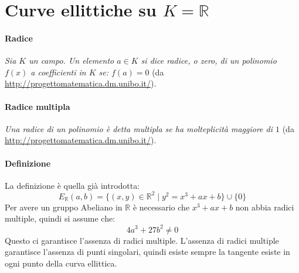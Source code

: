 

\section{Curve ellittiche su $K=\mathbb{R}$}
\paragraph{Radice} \emph{Sia $K$ un campo. Un elemento $a \in K$ si dice radice, o zero, di un polinomio $f(x)$ a coefficienti in $K$ se: $f(a) = 0$} (da \url{http://progettomatematica.dm.unibo.it/}).

\paragraph{Radice multipla} \emph{Una radice di un polinomio è detta multipla se ha molteplicità maggiore di $1$} (da \url{http://progettomatematica.dm.unibo.it/}).

\paragraph{Definizione} La definizione è quella già introdotta:
$$ E_{\mathbb{R}}(a,b) = \{(x,y) \in \mathbb{R}^2 \mid y^2 = x^3 + ax +b \} \cup \{0\} $$
Per avere un gruppo Abeliano in $\mathbb{R}$ è necessario che $x^3 + ax + b$ non abbia radici multiple, quindi si assume che:
$$ 4a^3 + 27b^2 \neq 0 $$
Questo ci garantisce l'assenza di radici multiple. L'assenza di radici multiple garantisce l'assenza di punti singolari, quindi esiste sempre la tangente esiste in ogni punto della curva ellittica.
